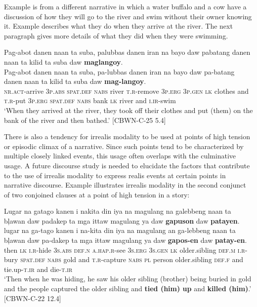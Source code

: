 Example  is from a different narrative in which a water buffalo and a cow have a discussion of how they will go to the river and swim without their owner knowing it. Example  describes what they do when they arrive at the river. The next paragraph gives more details of what they did when they were swimming.

\ea
\label{ex:andthenbathed}
Pag-abot danen naan ta suba, palubbas danen iran na bayo daw pabatang danen naan ta kilid ta suba daw \textbf{maglangoy}.\\\smallskip
\gll Pag-abot danen naan ta suba, pa-lubbas danen iran na bayo daw pa-batang danen naan ta kilid ta suba daw \textbf{mag-langoy}.\\
\textsc{nr.act}-arrive 3\textsc{p.abs} \textsc{spat.def} \textsc{nabs} river \textsc{t.r}-remove 3\textsc{p.erg} 3\textsc{p.gen} \textsc{lk} clothes and \textsc{t.r}-put 3\textsc{p.erg} \textsc{spat.def} \textsc{nabs} bank \textsc{lk} river and \textsc{i.ir}-swim \\
\glt ‘When they arrived at the river, they took off their clothes and put (them) on the bank of the river and then bathed.’ [CBWN-C-25 5.4]
\z

There is also a tendency for irrealis modality to be used at points of high tension or episodic climax of a narrative. Since such points tend to be characterized by multiple closely linked events, this usage often overlaps with the culminative usage. A future discourse study is needed to elucidate the factors that contribute to the use of irrealis modality to express realis events at certain points in narrative discourse. Example  illustrates irrealis modality in the second conjunct of two conjoined clauses at a point of high tension in a story:

\ea
\label{ex:andkilledhim}
Lugar na gatago kanen i nakita din iya na magulang na galebbeng naan ta bļawan daw padakep ta mga ittaw magulang ya daw \textbf{gapuson} daw \textbf{patayen}.\\\smallskip
\gll lugar na ga-tago kanen i na-kita din iya na magulang an ga-lebbeng naan ta  bļawan daw pa-dakep ta mga ittaw magulang ya daw \textbf{gapos-en} daw \textbf{patay-en}. \\
then \textsc{lk} \textsc{i.r}-hide 3\textsc{s.abs} \textsc{def.n} \textsc{a.hap.r}-see 3\textsc{s.erg} 3\textsc{s.gen} \textsc{lk} older.sibling \textsc{def.m} \textsc{i.r}-bury \textsc{spat.def} \textsc{nabs} gold and \textsc{t.r}-capture \textsc{nabs} \textsc{pl} person older.sibling \textsc{def.f} and tie.up-\textsc{t.ir} and die-\textsc{t.ir} \\
\glt ‘Then when he was hiding, he saw his older sibling (brother) being buried in gold and the people captured the older sibling and \textbf{tied (him) up} and \textbf{killed (him)}.’ [CBWN-C-22 12.4]
\z
